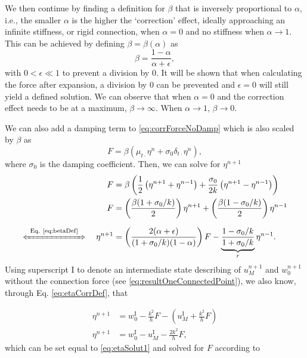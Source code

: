 We then continue by finding a definition for $\beta$ that is inversely proportional to $\alpha$, i.e., the smaller $\alpha$ is the higher the `correction' effect, ideally approaching an infinite stiffness, or rigid connection, when $\alpha = 0$ and no stiffness when $\alpha \rightarrow 1$. This can be achieved by defining $\beta = \beta(\alpha)$ as
\def\plusEps{+ \epsilon}
\def\alfPlusEps{(\alpha \plusEps)}
\begin{equation}\label{eq:betaDef}
    \beta = \frac{1 - \alpha}{\alpha \plusEps},
\end{equation}
with $0<\epsilon \ll 1$ to prevent a division by 0. It will be shown that when calculating the force after expansion, a division by 0 can be prevented and $\epsilon = 0$ will still yield a defined solution. We can observe that when $\alpha = 0$ and the correction effect needs to be at a maximum, $\beta\rightarrow \infty$. When $\alpha \rightarrow 1$, $\beta \rightarrow 0$.

We can also add a damping term to \eqref{eq:corrForceNoDamp} which is also scaled by $\beta$ as
\begin{equation}\label{eq:corrForce}
    F = \beta \left(\mu_{t\cdot}\eta^n +\sigma_0\delta_{t\cdot}\eta^n \right),
\end{equation}
where $\sigma_0$ is the damping coefficient. Then, we can solve for $\eta^{n+1}$ 
\begin{align}
    F &= \beta\left(\frac{1}{2}\left(\eta^{n+1}+\eta^{n-1}\right) + \frac{\sigma_0}{2k}\left(\eta^{n+1}-\eta^{n-1}\right)\right)\nonumber\\
    F&= \left(\frac{\beta (1 + \sigma_0/k)}{2}\right)\eta^{n+1} + \left(\frac{\beta (1 - \sigma_0/k)}{2}\right) \eta^{n-1}\nonumber\\
    \xLeftrightarrow{\mystrut\ \text{Eq. \eqref{eq:betaDef}}\ } \quad \eta^{n+1} &= \left(\frac{2
    \alfPlusEps}{(1+\sigma_0/k)(1-\alpha)}\right)F - \underbrace{\frac{1-\sigma_0/k}{1+\sigma_0/k}}_{r}\eta^{n-1}.\label{eq:etaSolut1}
\end{align}
Using superscript $\text{I}$ to denote an intermediate state describing of $u^{n+1}_M$ and $w^{n+1}_0$ without the connection force (see \eqref{eq:resultOneConnectedPoint}), we also know, through Eq. \eqref{eq:etaCorrDef}, that 

\begin{align}
    \eta^{n+1} &= w_0^\text{I}-\frac{k^2}{h}F-\left(u_M^\text{I}+\frac{k^2}{h}F\right)\nonumber\\
    \eta^{n+1} &= w_0^\text{I} - u_M^\text{I} - \frac{2k^2}{h}F,\label{eq:etaNext}
\end{align}
which can be set equal to \eqref{eq:etaSolut1} and solved for $F$ according to 

